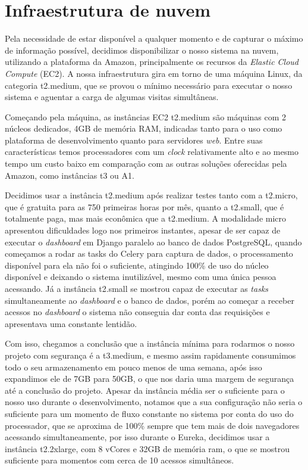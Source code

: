 \section{Infraestrutura de nuvem}
\indent
\par Pela necessidade de estar disponível a qualquer momento e de capturar o máximo de informação possível, decidimos disponibilizar o nosso sistema na nuvem, utilizando a plataforma da Amazon, principalmente os recursos da \textit{Elastic Cloud Compute} (EC2). A nossa infraestrutura gira em torno de uma máquina Linux, da categoria t2.medium, que se provou o mínimo necessário para executar o nosso sistema e aguentar a carga de algumas visitas simultâneas.
\indent
\par Começando pela máquina, as instâncias EC2 t2.medium são máquinas com 2 núcleos dedicados, 4GB de memória RAM, indicadas tanto para o uso como plataforma de desenvolvimento quanto para servidores \textit{web}. Entre suas características temos processadores com um \textit{clock} relativamente alto e ao mesmo tempo um custo baixo em comparação com as outras soluções oferecidas pela Amazon, como instâncias t3 ou A1. 
\indent
\par Decidimos usar a instância t2.medium após realizar testes tanto com a t2.micro, que é gratuita para as 750 primeiras horas por mês, quanto a t2.small, que é totalmente paga, mas mais econômica que a t2.medium. A modalidade micro apresentou dificuldades logo nos primeiros instantes, apesar de ser capaz de executar o \textit{dashboard} em Django paralelo ao banco de dados PostgreSQL, quando começamos a rodar as tasks do Celery para captura de dados, o processamento disponível para ela não foi o suficiente, atingindo 100\% de uso do núcleo disponível e deixando o sistema inutilizável, mesmo com uma única pessoa acessando. Já a instância t2.small se mostrou capaz de executar as \textit{tasks} simultaneamente ao \textit{dashboard} e o banco de dados, porém ao começar a receber acessos no \textit{dashboard} o sistema não conseguia dar conta das requisições e apresentava uma constante lentidão. 
\indent
\par Com isso, chegamos a conclusão que a instância mínima para rodarmos o nosso projeto com segurança é a t3.medium, e mesmo assim rapidamente consumimos todo o seu armazenamento em pouco menos de uma semana, após isso expandimos ele de 7GB para 50GB, o que nos daria uma margem de segurança até a conclusão do projeto. Apesar da instância média ser o suficiente para o nosso uso durante o desenvolvimento, notamos que a sua configuração não seria o suficiente para um momento de fluxo constante no sistema por conta do uso do processador, que se aproxima de 100\% sempre que tem mais de dois navegadores acessando simultaneamente, por isso durante o Eureka, decidimos usar a instância t2.2xlarge, com 8 vCores e 32GB de memória ram, o que se mostrou suficiente para momentos com cerca de 10 acessos simultâneos.

